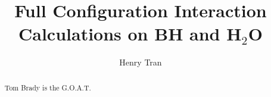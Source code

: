 \documentclass[final,3p,times,twocolumn]{elsarticle}
\begin{document}
\begin{frontmatter}



\title{Full Configuration Interaction Calculations on BH and H$_2$O}


\author{Henry Tran}

\address{Department of Chemistry, Lensfield Road, Cambridge, UK,
CB2 1EW}

\begin{abstract}
Tom Brady is the G.O.A.T.
\end{abstract}

\end{frontmatter}


\end{document}
